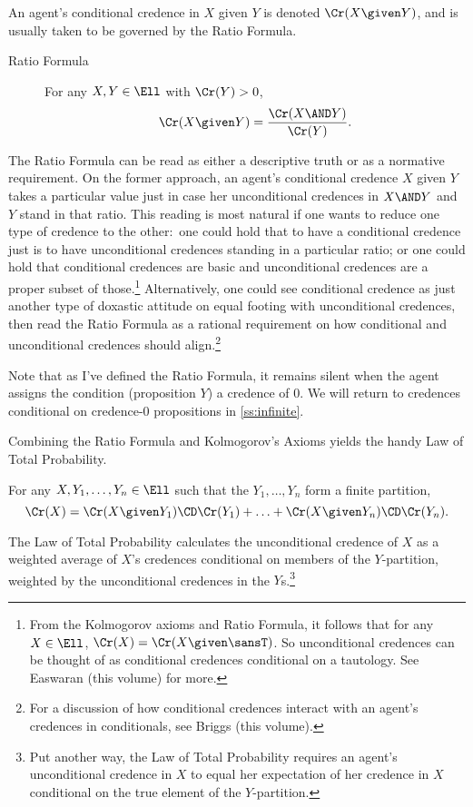 An agent's conditional credence in $X$ given $Y$ is denoted $\Cr(X \given Y)$, and is usually taken to be governed by the Ratio Formula.
\begin{description}
\item[Ratio Formula] {For any $X, Y \in \Ell$ with $\Cr(Y)>0$,
$$\Cr(X \given Y)=\frac{\Cr(X \AND Y)}{\Cr(Y)}.$$}
\end{description}
The Ratio Formula can be read as either a descriptive truth or as a normative requirement. On the former approach, an agent's conditional credence $X$ given $Y$ takes a particular value just in case her unconditional credences in $X \AND Y$ and $Y$ stand in that ratio. This reading is most natural if one wants to reduce one type of credence to the other:\ one could hold that to have a conditional credence just is to have unconditional credences standing in a particular ratio; or one could hold that conditional credences are basic and unconditional credences are a proper subset of those.\footnote
{\label{n:condbas}From the Kolmogorov axioms and Ratio Formula, it follows that for any $X \in \Ell$, $\Cr(X)=\Cr(X \given \sansT)$. So unconditional credences can be thought of as conditional credences conditional on a tautology. See Easwaran (this volume) for more.}
 Alternatively, one could see conditional credence as just another type of doxastic attitude on equal footing with unconditional credences, then read the Ratio Formula as a rational requirement on how conditional and unconditional credences should align.\footnote
{For a discussion of how conditional credences interact with an agent's credences in conditionals, see Briggs (this volume).}

Note that as I've defined the Ratio Formula, it remains silent when the agent assigns the condition (proposition $Y$) a credence of $0$. We will return to credences conditional on credence-$0$ propositions in \autoref{ss:infinite}.

Combining the Ratio Formula and Kolmogorov's Axioms yields the handy Law of Total Probability.
\begin{description}\label{p:LTP}
\item[Law of Total Probability] {For any $X, Y_1, \ldots, Y_n \in \Ell$ such that the $Y_1, \ldots, Y_n$ form a finite partition, $$\Cr(X)=\Cr(X \given Y_1) \CD \Cr(Y_1) + \ldots + \Cr(X \given Y_n) \CD \Cr(Y_n).$$}
\end{description} 
The Law of Total Probability calculates the unconditional credence of $X$ as a weighted average of $X$'s credences conditional on members of the $Y$-partition, weighted by the unconditional credences in the $Y$s.\footnote
{Put another way, the Law of Total Probability requires an agent's unconditional credence in $X$ to equal her expectation of her credence in $X$ conditional on the true element of the $Y$-partition.}

